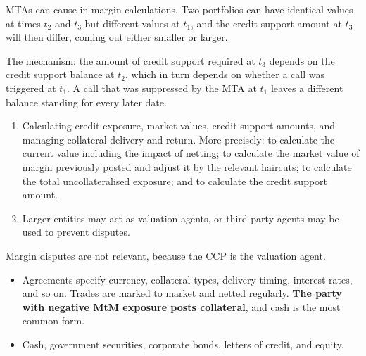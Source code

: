 \begin{crtrapbox}
MTAs can cause  in margin calculations. Two portfolios can
have identical values at times $t_2$ and $t_3$ but different values at $t_1$, and
the credit support amount at $t_3$ will then differ, coming out either smaller or
larger.

\smallskip
The mechanism: the amount of credit support required at $t_3$ depends on the
credit support balance at $t_2$, which in turn depends on whether a call was
triggered at $t_1$. A call that was suppressed by the MTA at $t_1$ leaves a
different balance standing for every later date.
\end{crtrapbox}


\begin{enumerate}[label=\alph*)]
\item {} Calculating credit exposure, market values, credit
support amounts, and managing collateral delivery and return. More precisely: to
calculate the current value including the impact of netting; to calculate the
market value of margin previously posted and adjust it by the relevant haircuts;
to calculate the total uncollateralised exposure; and to calculate the credit
support amount.
\item {} Larger entities may act as valuation agents, or
third-party agents may be used to prevent disputes.
\end{enumerate}

\begin{crkeybox}
Margin disputes are not relevant, because the CCP is the valuation agent.
\end{crkeybox}


\begin{itemize}
\item {} Agreements specify currency, collateral types, delivery
timing, interest rates, and so on. Trades are marked to market and netted
regularly. \textbf{The party with negative MtM exposure posts collateral}, and
cash is the most common form.
\item {} Cash, government securities, corporate bonds, letters of
credit, and equity.
\end{itemize}

